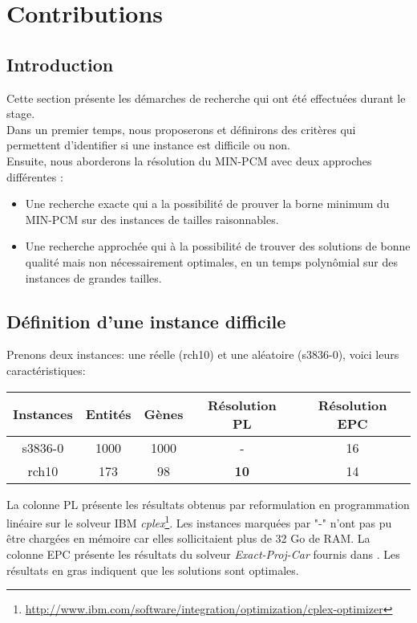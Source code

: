 \section{Contributions}

\subsection{Introduction} 
Cette section présente les démarches de recherche qui ont été effectuées durant le stage.\\
Dans un premier temps, nous proposerons et définirons des critères qui permettent d'identifier si une instance est difficile ou non.\\
Ensuite, nous aborderons la résolution du MIN-PCM avec deux approches différentes :
\begin{itemize}
\item Une recherche exacte qui a la possibilité de prouver la borne minimum du MIN-PCM sur des instances de tailles raisonnables.
\item Une recherche approchée qui à la possibilité de trouver des solutions de bonne qualité mais non nécessairement optimales, en un temps polynômial sur des instances de grandes tailles.
\end{itemize} 


\subsection{Définition d'une instance difficile}
\label{subsectionInstanceDifficile}
Prenons deux instances: une réelle (rch10) et une aléatoire (s3836-0), voici leurs caractéristiques:
\begin{center}
	\begin{tabular}{|c|c|c|c|c|}
	\hline 
	Instances & Entités & Gènes & Résolution PL & Résolution EPC \\ 
	\hline 
	s3836-0 & 1000 & 1000 & - & 16 \\ 
	\hline
	rch10 & 173 & 98 & \textbf{10} & 14 \\ 
	\hline
	\end{tabular} 
\end{center}
La colonne PL présente les résultats obtenus par reformulation en programmation linéaire sur le solveur IBM \textit{cplex}\footnote{\url{http://www.ibm.com/software/integration/optimization/cplex-optimizer}}. Les instances marquées par "-" n'ont pas pu être chargées en mémoire car elles sollicitaient plus de 32 Go de RAM. La colonne EPC présente les résultats du solveur \emph{Exact-Proj-Car} fournis dans \cite{Chhel2013}. Les résultats en gras indiquent que les solutions sont optimales.
\vspace{7mm}

